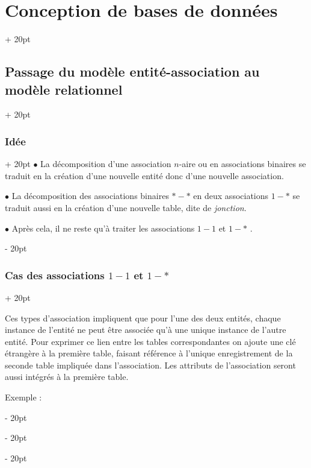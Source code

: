 \documentclass[a4paper, 12pt, twoside]{article}
\newcommand{\ind}[1][20pt]{\advance\leftskip + #1}
\newcommand{\deind}[1][20pt]{\advance\leftskip - #1}
\newenvironment{indt}[2][20pt]{#2 \par \ind[#1]}{\par \deind} %
\begin{document}
\begin{indt}{\section{Conception de bases de données}}
\begin{indt}{\subsection{Passage du modèle entité-association au modèle relationnel}}
\begin{indt}{\subsubsection{Idée}}
                $\bullet$ La décomposition d'une association $n$-aire ou en associations binaires se traduit en la création d'une nouvelle entité donc d'une nouvelle association.

                $\bullet$ La décomposition des associations binaires $*-*$ en deux associations $1-*$ se traduit aussi en la création d'une nouvelle table, dite de \textit{jonction}.

                $\bullet$ Après cela, il ne reste qu'à traiter les associations $1-1$  et $1-*$ .
            \end{indt}

            \vspace{12pt}
            
            \begin{indt}{\subsubsection{Cas des associations $1-1$ et $1-*$}}
                \label{2.2.2}

                Ces types d'association impliquent que pour l'une des deux entités, chaque instance de l'entité ne peut être associée qu'à une unique instance de l'autre entité. Pour exprimer ce lien entre les tables correspondantes on ajoute une clé étrangère à la première table, faisant référence à l'unique enregistrement de la seconde table impliquée dans l'association. Les attributs de l'association seront aussi intégrés à la première table.


                Exemple :


\end{indt}
\end{indt}
\end{indt}
\end{document}

